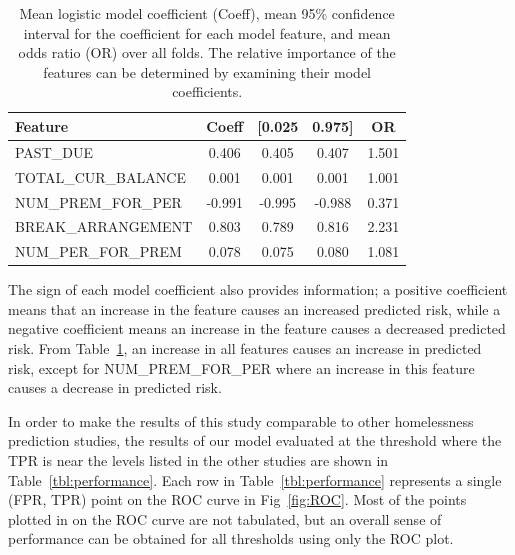\documentclass[10pt,letterpaper]{article}
\begin{document}
\begin{table}[!h]
    \centering
    \begin{tabular}{lcccc}
    \toprule
    Feature &                    Coeff &       [0.025 &       0.975] &  OR \\
    \midrule
             PAST\_DUE &         0.406 &        0.405 &        0.407 &    1.501 \\
    TOTAL\_CUR\_BALANCE &        0.001 &        0.001 &        0.001 &    1.001 \\
     NUM\_PREM\_FOR\_PER &      -0.991 &       -0.995 &       -0.988 &    0.371 \\
    BREAK\_ARRANGEMENT &         0.803 &        0.789 &        0.816 &    2.231 \\
     NUM\_PER\_FOR\_PREM &       0.078 &        0.075 &        0.080 &    1.081 \\
    \bottomrule
    \end{tabular}
    \caption{Mean logistic model coefficient (Coeff), mean 95\% confidence interval for the coefficient for each model feature, and mean odds ratio (OR) over all folds. The relative importance of the features can be determined by examining their model coefficients.}
    \label{tbl:meanParams}
\end{table}

The sign of each model coefficient also provides information; a positive coefficient means that an increase in the feature causes an increased predicted risk, while a negative coefficient means an increase in the feature causes a decreased predicted risk. From Table~\ref{tbl:meanParams}, an increase in all features causes an increase in predicted risk, except for NUM\_PREM\_FOR\_PER where an increase in this feature causes a decrease in predicted risk.

In order to make the results of this study comparable to other homelessness prediction studies, the results of our model evaluated at the threshold where the TPR is near the levels listed in the other studies are shown in Table~\ref{tbl:performance}. Each row in Table~\ref{tbl:performance} represents a single (FPR, TPR) point on the ROC curve in Fig~\ref{fig:ROC}. Most of the points plotted in on the ROC curve are not tabulated, but an overall sense of performance can be obtained for all thresholds using only the ROC plot.
\end{document}
